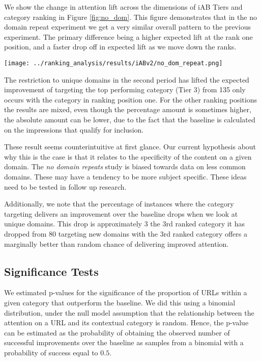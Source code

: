 \documentclass[sigconf]{acmart}
\begin{document}
We show the change in attention lift across the dimensions of iAB Tiers and category ranking
in Figure \ref{fig:no_dom}. This figure demonstrates that in the no domain repeat experiment
we get a very similar overall pattern to the previous experiment. The primary difference
being a higher expected lift at the rank one position, and a faster drop off in expected
lift as we move down the ranks.

\begin{figure*}
\texttt{[image: ../ranking\_analysis/results/iABv2/no\_dom\_repeat.png]}
\caption{Expected Lift in Attention Time on Inventory without Repeated Domains.}
\label{fig:no_dom}
\end{figure*}

The restriction to unique domains in the second period has lifted the expected improvement
of targeting the top performing category (Tier 3) from 135%
only occurs with the category in ranking position one. For the other ranking positions
the results are mixed, even though the percentage amount is sometimes higher, the
absolute amount can be lower, due to the fact that the baseline is calculated on
the impressions that qualify for inclusion.

These result seems counterintuitive at first glance. Our current hypothesis about why
this is the case is that it relates to the specificity of the content on a given domain.
The \emph{no domain repeats} study is biased towards data on less common domains.
These may have a tendency to be more subject specific.
These ideas need to be tested in follow up research.

Additionally, we note that the percentage of instances where the category targeting
delivers an improvement over the baseline drops when we look at unique domains.
This drop is approximately 3%
the 3rd ranked category it has dropped from 80%
targeting new domains with the 3rd ranked category offers a marginally better than
random chance of delivering improved attention.

\subsection{Significance Tests}

We estimated p-values for the significance of the proportion of URLs within a given category
that outperform the baseline. We did this using a binomial distribution, under the null model
assumption that the relationship between the attention on a URL and its contextual category
is random. Hence, the p-value can be estimated as the probability of obtaining the observed
number of successful improvements over the baseline as samples from a binomial with a probability
of success equal to $0.5$.
\end{document}
